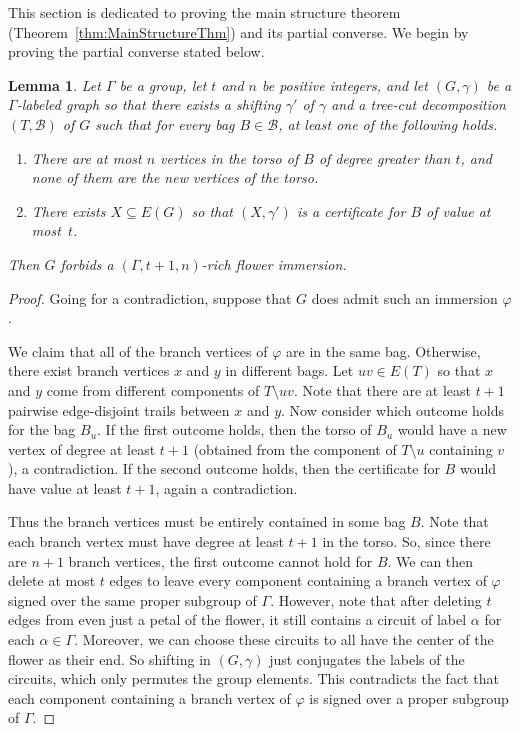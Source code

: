 \documentclass[11pt]{article}
\newtheorem{lemma}[thm]{Lemma}
\theoremstyle{definition}
\begin{document}
This section is dedicated to proving the main structure theorem (Theorem~\ref{thm:MainStructureThm}) and its partial converse. We begin by proving the partial converse stated below.

\begin{lemma}
\label{lem:convOfStructure}
    Let $\Gamma$ be a group, let $t$ and $n$ be positive integers, and let $(G, \gamma)$ be a $\Gamma$-labeled graph so that there exists a shifting $\gamma'$ of $\gamma$ and a tree-cut decomposition $(T, \mathscr{B})$ of $G$ such that for every bag $B \in \mathscr{B}$, at least one of the following holds.
    \begin{enumerate}
        \item There are at most $n$ vertices in the torso of $B$ of degree greater than $t$, and none of them are the new vertices of the torso.
        \item There exists $X \subseteq E(G)$ so that $(X,\gamma')$ is a certificate for $B$ of value at most~$t$.
    \end{enumerate}
    Then $G$ forbids a $(\Gamma, t + 1,n)$-rich flower immersion.
\end{lemma}
\begin{proof}
    Going for a contradiction, suppose that $G$ does admit such an immersion $\varphi$. 
    
    We claim that all of the branch vertices of $\varphi$ are in the same bag. Otherwise, there exist branch vertices $x$ and $y$ in different bags. Let $uv \in E(T)$ so that $x$ and $y$ come from different components of $T\setminus uv$. Note that there are at least $t+1$ pairwise edge-disjoint trails between $x$ and $y$. Now consider which outcome holds for the bag $B_u$. If the first outcome holds, then the torso of $B_u$ would have a new vertex of degree at least $t+1$ (obtained from the component of $T\setminus u$ containing $v$), a contradiction. If the second outcome holds, then the certificate for $B$ would have value at least $t+1$, again a contradiction.

    Thus the branch vertices must be entirely contained in some bag $B$. Note that each branch vertex must have degree at least $t+1$ in the torso. So, since there are $n+1$ branch vertices, the first outcome cannot hold for $B$. We can then delete at most $t$ edges to leave every component containing a branch vertex of $\varphi$ signed over the same proper subgroup of $\Gamma$. However, note that after deleting $t$ edges from even just a petal of the flower, it still contains a circuit of label $\alpha$ for each $\alpha \in \Gamma$. Moreover, we can choose these circuits to all have the center of the flower as their end. So shifting in $(G, \gamma)$ just conjugates the labels of the circuits, which only permutes the group elements. This contradicts the fact that each component containing a branch vertex of $\varphi$ is signed over a proper subgroup of $\Gamma$.
\end{proof}
\end{document}
